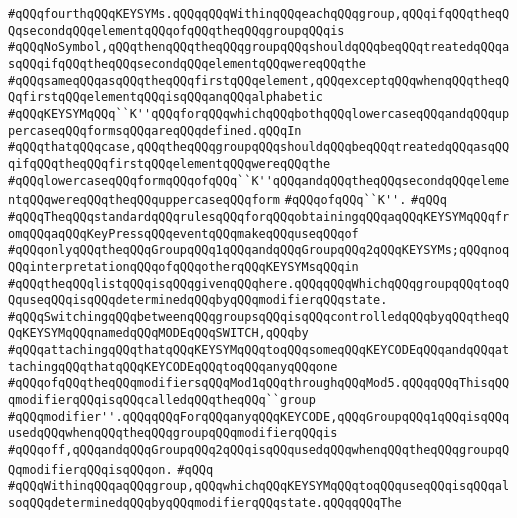 \verb|#qQQqfourthqQQqKEYSYMs.qQQqqQQqWithinqQQqeachqQQqgroup,qQQqifqQQqtheqQQqsecondqQQqelementqQQqofqQQqtheqQQqgroupqQQqis|\newline
\verb|#qQQqNoSymbol,qQQqthenqQQqtheqQQqgroupqQQqshouldqQQqbeqQQqtreatedqQQqasqQQqifqQQqtheqQQqsecondqQQqelementqQQqwereqQQqthe|\newline
\verb|#qQQqsameqQQqasqQQqtheqQQqfirstqQQqelement,qQQqexceptqQQqwhenqQQqtheqQQqfirstqQQqelementqQQqisqQQqanqQQqalphabetic|\newline
\verb|#qQQqKEYSYMqQQq``K''qQQqforqQQqwhichqQQqbothqQQqlowercaseqQQqandqQQquppercaseqQQqformsqQQqareqQQqdefined.qQQqIn|\newline
\verb|#qQQqthatqQQqcase,qQQqtheqQQqgroupqQQqshouldqQQqbeqQQqtreatedqQQqasqQQqifqQQqtheqQQqfirstqQQqelementqQQqwereqQQqthe|\newline
\verb|#qQQqlowercaseqQQqformqQQqofqQQq``K''qQQqandqQQqtheqQQqsecondqQQqelementqQQqwereqQQqtheqQQquppercaseqQQqform|\newline
\verb|#qQQqofqQQq``K''.|\newline
\verb|#qQQq|\newline
\verb|#qQQqTheqQQqstandardqQQqrulesqQQqforqQQqobtainingqQQqaqQQqKEYSYMqQQqfromqQQqaqQQqKeyPressqQQqeventqQQqmakeqQQquseqQQqof|\newline
\verb|#qQQqonlyqQQqtheqQQqGroupqQQq1qQQqandqQQqGroupqQQq2qQQqKEYSYMs;qQQqnoqQQqinterpretationqQQqofqQQqotherqQQqKEYSYMsqQQqin|\newline
\verb|#qQQqtheqQQqlistqQQqisqQQqgivenqQQqhere.qQQqqQQqWhichqQQqgroupqQQqtoqQQquseqQQqisqQQqdeterminedqQQqbyqQQqmodifierqQQqstate.|\newline
\verb|#qQQqSwitchingqQQqbetweenqQQqgroupsqQQqisqQQqcontrolledqQQqbyqQQqtheqQQqKEYSYMqQQqnamedqQQqMODEqQQqSWITCH,qQQqby|\newline
\verb|#qQQqattachingqQQqthatqQQqKEYSYMqQQqtoqQQqsomeqQQqKEYCODEqQQqandqQQqattachingqQQqthatqQQqKEYCODEqQQqtoqQQqanyqQQqone|\newline
\verb|#qQQqofqQQqtheqQQqmodifiersqQQqMod1qQQqthroughqQQqMod5.qQQqqQQqThisqQQqmodifierqQQqisqQQqcalledqQQqtheqQQq``group|\newline
\verb|#qQQqmodifier''.qQQqqQQqForqQQqanyqQQqKEYCODE,qQQqGroupqQQq1qQQqisqQQqusedqQQqwhenqQQqtheqQQqgroupqQQqmodifierqQQqis|\newline
\verb|#qQQqoff,qQQqandqQQqGroupqQQq2qQQqisqQQqusedqQQqwhenqQQqtheqQQqgroupqQQqmodifierqQQqisqQQqon.|\newline
\verb|#qQQq|\newline
\verb|#qQQqWithinqQQqaqQQqgroup,qQQqwhichqQQqKEYSYMqQQqtoqQQquseqQQqisqQQqalsoqQQqdeterminedqQQqbyqQQqmodifierqQQqstate.qQQqqQQqThe|\newline
